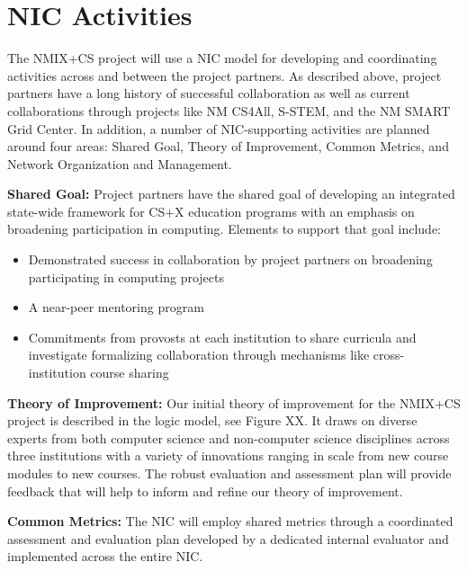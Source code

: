 \section{NIC Activities}
The NMIX+CS project will use a NIC model for developing and coordinating activities across and between the project partners. As described above, project partners have a long history of successful collaboration as well as current collaborations through projects like NM CS4All, S-STEM, and the NM SMART Grid Center. In addition, a number of NIC-supporting activities are planned around four areas: Shared Goal, Theory of Improvement, Common Metrics, and Network Organization and Management.

\textbf{Shared Goal:} Project partners have the shared goal of developing an integrated state-wide framework for CS+X education programs with an emphasis on broadening participation in computing. Elements to support that goal include:
\begin{itemize}
        \item Demonstrated success in collaboration by project partners on broadening participating in computing projects
        \item A near-peer mentoring program 
        \item Commitments from provosts at each institution to share curricula and investigate formalizing collaboration through mechanisms like cross-institution course sharing
\end{itemize}
\textbf{Theory of Improvement:} Our initial theory of improvement for the NMIX+CS project is described in the logic model, see Figure XX. It draws on diverse experts from both computer science and non-computer science disciplines across three institutions with a variety of innovations ranging in scale from new course modules to new courses. The robust evaluation and assessment plan will provide feedback that will help to inform and refine our theory of improvement.

\textbf{Common Metrics:} The NIC will employ shared metrics through a coordinated assessment and evaluation plan developed by a dedicated internal evaluator and implemented across the entire NIC.

